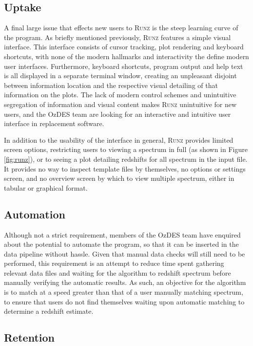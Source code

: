 \documentclass[titlesmallcaps, examinerscopy, copyrightpage]{uqthesis}
\newcommand{\runz}{\textsc{Runz}}
\begin{document}
\subsection{Uptake}

A final large issue that effects new users to \textsc{Runz} is the steep learning curve of the program. As briefly mentioned previously, \runz{} features a simple visual interface. This interface consists of cursor tracking, plot rendering and keyboard shortcuts, with none of the modern hallmarks and interactivity the define modern user interfaces. Furthermore, keyboard shortcuts, program output and help text is all displayed in a separate terminal window, creating an unpleasant disjoint between information location and the respective visual detailing of that information on the plots. The lack of modern control schemes and unintuitive segregation of information and visual content makes \runz{} unintuitive for new users, and the OzDES team are looking for an interactive and intuitive user interface in replacement software.

In addition to the usability of the interface in general, \runz{} provides limited screen options, restricting users to viewing a spectrum in full (as shown in Figure \ref{fig:runz}), or to seeing a plot detailing redshifts for all spectrum in the input file. It provides no way to inspect template files by themselves, no options or settings screen, and no overview screen by which to view multiple spectrum, either in tabular or graphical format.

\subsection{Automation}

Although not a strict requirement, members of the OzDES team have enquired about the potential to automate the program, so that it can be inserted in the data pipeline without hassle. Given that manual data checks will still need to be performed, this requirement is an attempt to reduce time spent gathering relevant data files and waiting for the algorithm to redshift spectrum before manually verifying the automatic results. As such, an objective for the algorithm is to match at a speed greater than that of a user manually matching spectrum, to ensure that users do not find themselves waiting upon automatic matching to determine a redshift estimate.

\subsection{Retention}
\end{document}

